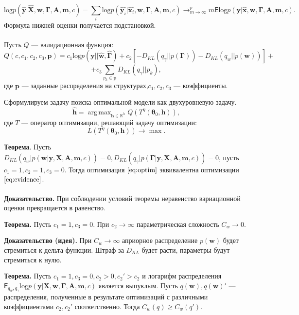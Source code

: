 \documentclass[12pt]{article}
\DeclareMathOperator*{\argmax}{arg\,max}
\begin{document}
\[
\text{log} p(\hat{\mathbf{y}}|\hat{\mathbf{X}},\mathbf{w}, \boldsymbol{\Gamma}, \mathbf{A},\mathbf{m}, c) = \sum_i \text{log} p(\hat{\mathbf{y}_i}|\hat{\mathbf{x}_i},\mathbf{w}, \boldsymbol{\Gamma}, \mathbf{A},\mathbf{m}, c) \to^p_{m \to \infty} m\mathsf{E}\text{log} p(\mathbf{y}|\hat{\mathbf{x}},\mathbf{w}, \boldsymbol{\Gamma}, \mathbf{A},\mathbf{m}, c).
\]
Формула нижней оценки получается подстановкой.
~\\~\\

Пусть $Q$ --- валидационная функция:
\[
    Q(c, c_1, c_2, c_3, \mathbf{p}) = c_1\text{log} p(\mathbf{y}||\hat{\mathbf{w}}, \hat{\boldsymbol{\Gamma}}) + c_2[-{D_{KL}}(q_\gamma||p(\boldsymbol{\Gamma})) - {D_{KL}}(q_{w}||p(\mathbf{w}))] + 
\]
\[
    + c_3\sum_{p_k \in \mathbf{p}}{D_{KL}}(q_\gamma||p_k),
\]
где $\mathbf{p}$ --- заданные распределения на структурах,$c_1,c_2,c_3$ --- коэффициенты.

Сформулируем задачу поиска оптимальной модели как двухуровневую задачу.
\begin{equation}
\label{eq:optim}
	\hat{\mathbf{h}} = \argmax_{\mathbf{h} \in \mathbb{R}^h} Q( T^\eta(\boldsymbol{\theta}_0, \mathbf{h})),
\end{equation}
где $T$ --- оператор оптимизации, решающий задачу оптимизации:
\[
    L(T^\eta(\boldsymbol{\theta}_0, \mathbf{h})) \to \max.
\]


\textbf{Теорема}. Пусть $D_{KL}(q_w|p(\mathbf{w}|\mathbf{y}, \mathbf{X}, \mathbf{A},\mathbf{m}, c)) = 0, D_{KL}(q_\gamma|p(\boldsymbol{\Gamma}|\mathbf{y}, \mathbf{X}, \mathbf{A},\mathbf{m}, c)) = 0$, пусть $c_1 = 1, c_2 = 1, c_3 = 0$. Тогда оптимизация $\eqref{eq:optim}$ эквивалентна оптимизации $\eqref{eq:evidence}$.\\~\\
\textbf{Доказательство.} При соблюдении условий теоремы неравенство вариационной оценки превращается в равенство. 

\textbf{Теорема.} Пусть $c_1 = 1, c_3 = 0$. При $c_2 \to \infty$ параметрическая сложность $C_w \to 0$.

\textbf{Доказательство (идея).} При $C_w \to \infty$ априорное распределение $p(\mathbf{w})$ будет стремиться к дельта-функции. Штраф за $D_{KL}$ будет расти, параметры будут стремиться к нулю.
   

\textbf{Теорема.} Пусть $c_1 = 1,  c_3 = 0, c_2 > 0, c_2' > c_2$ и  логарифм распределения $\mathsf{E}_{q_w,q_\gamma}\text{log} p(\mathbf{y}|\mathbf{X},\mathbf{w}, \boldsymbol{\Gamma}, \mathbf{A},\mathbf{m}, c)$ является выпуклым.
Пусть $q(\mathbf{w}), q(\mathbf{w})'$ --- распределения, полученные в результате оптимизаций с различными коэффициентами $c_2, c_2'$ соответственно. Тогда  $C_w(q) \geq C_w(q').$  
\end{document}
